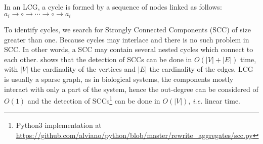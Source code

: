 \documentclass{entcs}
\begin{document}

\begin{definition}[cycle]
In an LCG, a cycle is formed by a sequence of nodes linked as follows: $a_i\to \circ \to \cdots \to \circ \to a_i$
\end{definition}

To identify cycles, we search for Strongly Connected Components (SCC) of size greater than one.
Because cycles may interlace and there is no such problem in SCC.
In other words, a SCC may contain several nested cycles which connect to each other.
\cite{tarjan1972} shows that the detection of SCCs can be done in $O (|V|+|E|)$ time, with $|V|$ the cardinality of the vertices and $|E|$ the cardinality of the edges.
LCG is usually a sparse graph, as in biological systems, the components mostly interact with only a part of the system, hence the out-degree can be considered of $O (1)$ and the detection of SCCs\footnote{Python3 implementation at \url{https://github.com/alviano/python/blob/master/rewrite_aggregates/scc.py}} can be done in $O(|V|)$, \textit{i.e.} linear time.
\end{document}
